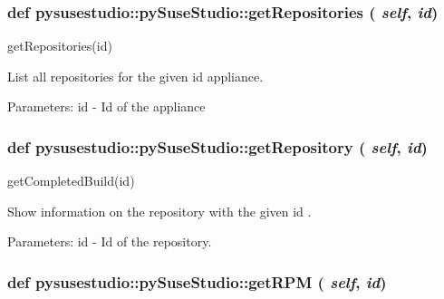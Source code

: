  \hypertarget{classpysusestudio_1_1py_suse_studio_aa9ac2b217553d0e92c065a023ecb159b}{
\subsubsection[{getRepositories}]{\setlength{\rightskip}{0pt plus 5cm}def pysusestudio::pySuseStudio::getRepositories ( {\em self}, \/   {\em id})}}
\label{classpysusestudio_1_1py_suse_studio_aa9ac2b217553d0e92c065a023ecb159b}
\begin{DoxyVerb}getRepositories(id)

        List all repositories for the given id appliance.  
            
            Parameters:
id - Id of the appliance

\end{DoxyVerb}
 \hypertarget{classpysusestudio_1_1py_suse_studio_a226b08a0195091512cd73c33881aa3ac}{
\subsubsection[{getRepository}]{\setlength{\rightskip}{0pt plus 5cm}def pysusestudio::pySuseStudio::getRepository ( {\em self}, \/   {\em id})}}
\label{classpysusestudio_1_1py_suse_studio_a226b08a0195091512cd73c33881aa3ac}
\begin{DoxyVerb}getCompletedBuild(id)

       Show information on the repository with the given id .
        
            Parameters:
id - Id of the repository.

\end{DoxyVerb}
 \hypertarget{classpysusestudio_1_1py_suse_studio_a57ade7463c2ed61ba29b096f7a084b44}{
\subsubsection[{getRPM}]{\setlength{\rightskip}{0pt plus 5cm}def pysusestudio::pySuseStudio::getRPM ( {\em self}, \/   {\em id})}}

